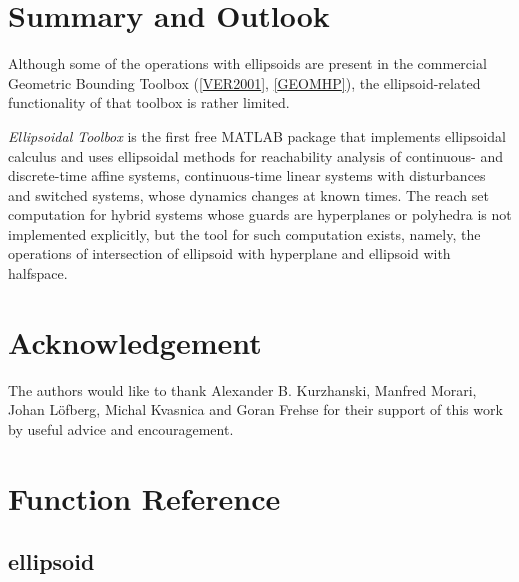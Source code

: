 \documentclass[letterpaper,10pt,english]{sphinxmanual}
\begin{document}
\chapter{Summary and Outlook}
\label{chap_summary::doc}\label{chap_summary:summary-and-outlook}
Although some of the operations with ellipsoids are present in the
commercial Geometric Bounding Toolbox ({\hyperref[chap_summary:ver2001]{{[}VER2001{]}}}, {\hyperref[chap_summary:geomhp]{{[}GEOMHP{]}}}),
the ellipsoid-related functionality of that
toolbox is rather limited.

\emph{Ellipsoidal Toolbox} is the first free MATLAB package that implements
ellipsoidal calculus and uses ellipsoidal methods for reachability
analysis of continuous- and discrete-time affine systems,
continuous-time linear systems with disturbances and switched systems,
whose dynamics changes at known times. The reach set computation for
hybrid systems whose guards are hyperplanes or polyhedra is not
implemented explicitly, but the tool for such computation exists,
namely, the operations of intersection of ellipsoid with hyperplane and
ellipsoid with halfspace.


\chapter{Acknowledgement}
\label{chap_acknowledge::doc}\label{chap_acknowledge:acknowledgement}
The authors would like to thank Alexander B. Kurzhanski, Manfred Morari,
Johan Löfberg, Michal Kvasnica and Goran Frehse for their support of
this work by useful advice and encouragement.


\chapter{Function Reference}
\label{chap_functions::doc}\label{chap_functions:function-reference}

\section{ellipsoid}
\label{chap_functions:ellipsoid}
\end{document}

